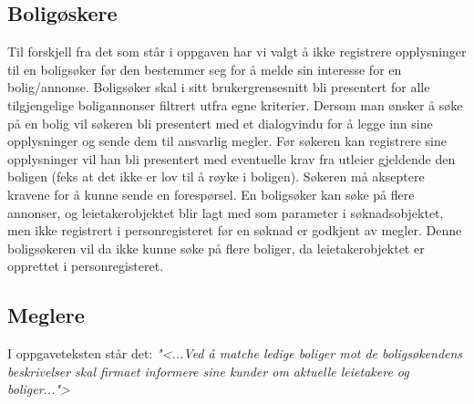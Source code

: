 \subsection{Boligøskere} \label{sec:sokere}
Til forskjell fra det som står i oppgaven har vi valgt å ikke registrere opplysninger til en boligsøker før den bestemmer seg for å melde sin interesse for en bolig/annonse. Boligsøker skal i sitt brukergrensesnitt bli presentert for alle tilgjengelige boligannonser filtrert utfra egne kriterier. Dersom man ønsker å søke på en bolig vil søkeren bli presentert med et dialogvindu for å legge inn sine opplysninger og sende dem til ansvarlig megler. Før søkeren kan registrere sine opplysninger vil han bli presentert med eventuelle krav fra utleier gjeldende den boligen (feks at det ikke er lov til å røyke i boligen). Søkeren må akseptere kravene for å kunne sende en forespørsel. En boligsøker kan søke på flere annonser, og leietakerobjektet blir lagt med som parameter i søknadsobjektet, men ikke registrert i personregisteret før en søknad er godkjent av megler. Denne boligsøkeren vil da ikke kunne søke på flere boliger, da leietakerobjektet er opprettet i personregisteret. 

\subsection{Meglere}
I oppgaveteksten står det:
\textit{"<...Ved å matche ledige boliger mot de boligsøkendens beskrivelser skal firmaet informere sine kunder om aktuelle leietakere og boliger...">}

